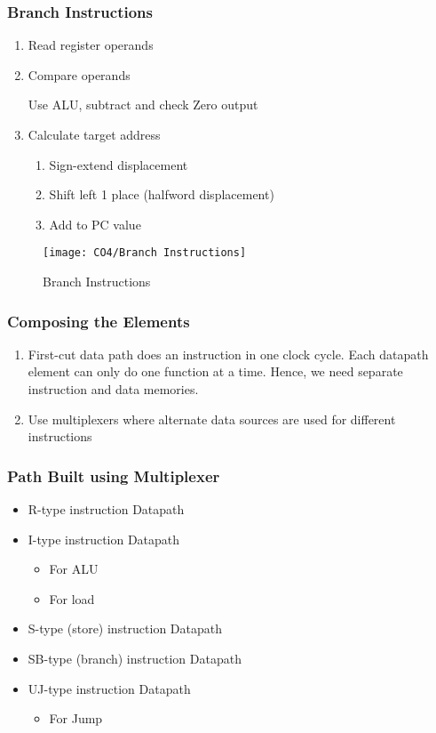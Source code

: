 \subsubsection{Branch Instructions}
\begin{enumerate}
    \item Read register operands
    \item Compare operands 
    
    \small Use ALU, subtract and check Zero output
    \item Calculate target address
    \begin{enumerate}
        \item\small Sign-extend displacement
        \item\small Shift left 1 place (halfword displacement)
        \item\small Add to PC value
    \end{enumerate}
\end{enumerate}

\begin{figure}[!htb]
    \centering
    \texttt{[image: CO4/Branch Instructions]}
    \caption{Branch Instructions}
\end{figure}

\subsubsection{Composing the Elements}
\begin{enumerate}
    \item First-cut data path does an instruction in one clock cycle. Each datapath element can only do one function at a time. Hence, we need separate instruction and data memories. 
    \item Use multiplexers where alternate data sources are used for different instructions
\end{enumerate}

\subsubsection{Path Built using Multiplexer}
\begin{itemize}
    \item R-type instruction Datapath
    \item I-type instruction Datapath
    \begin{itemize}
        \item\small For ALU
        \item\small For load
    \end{itemize}
    \item S-type (store) instruction Datapath
    \item SB-type (branch) instruction Datapath
    \item UJ-type instruction Datapath
    \begin{itemize}
        \item\small  For Jump
    \end{itemize}
\end{itemize}

